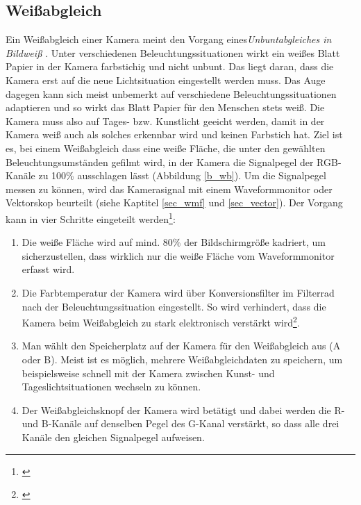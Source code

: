 \subsection{Weißabgleich}
\label{sec_wb}
Ein Weißabgleich einer Kamera meint den Vorgang eines\emph{\glqq Unbuntabgleiches in Bildweiß\grqq} \citep[414]{schmidt}. Unter verschiedenen Beleuchtungssituationen wirkt ein weißes Blatt Papier in der Kamera farbstichig und nicht unbunt. Das liegt daran, dass die Kamera erst auf die neue Lichtsituation eingestellt werden muss. Das Auge dagegen kann sich meist unbemerkt auf verschiedene Beleuchtungssituationen adaptieren und so wirkt das Blatt Papier für den Menschen stets weiß. Die Kamera muss also auf Tages- bzw. Kunstlicht geeicht werden, damit in der Kamera weiß auch als solches erkennbar wird und keinen Farbstich hat. Ziel ist es, bei einem Weißabgleich dass eine weiße Fläche, die unter den gewählten Beleuchtungsumständen gefilmt wird, in der Kamera die Signalpegel der RGB-Kanäle zu 100\% ausschlagen lässt (Abbildung \ref{b_wb}). Um die Signalpegel messen zu können, wird das Kamerasignal mit einem Waveformmonitor oder Vektorskop beurteilt (siehe Kaptitel \ref{sec_wmf} und \ref{sec_vector}). Der Vorgang kann in vier Schritte eingeteilt werden\footnote{\cite[206]{heinen}}:

\begin{enumerate}
\item Die weiße Fläche wird auf mind. 80\% der Bildschirmgröße kadriert, um sicherzustellen, dass wirklich nur die weiße Fläche vom Waveformmonitor erfasst wird.
\item Die Farbtemperatur der Kamera wird über Konversionsfilter im Filterrad nach der Beleuchtungssituation eingestellt. So wird verhindert, dass die Kamera beim Weißabgleich zu stark elektronisch verstärkt wird\footnote{\cite[415]{schmidt}}.
\item Man wählt den Speicherplatz auf der Kamera für den Weißabgleich aus (A oder B). Meist ist es möglich, mehrere Weißabgleichdaten zu speichern, um beispielsweise schnell mit der Kamera zwischen Kunst- und Tageslichtsituationen wechseln zu können.
\item Der Weißabgleichsknopf der Kamera wird betätigt und dabei werden die R- und B-Kanäle auf denselben Pegel des G-Kanal verstärkt, so dass alle drei Kanäle den gleichen Signalpegel aufweisen.
\end{enumerate}

